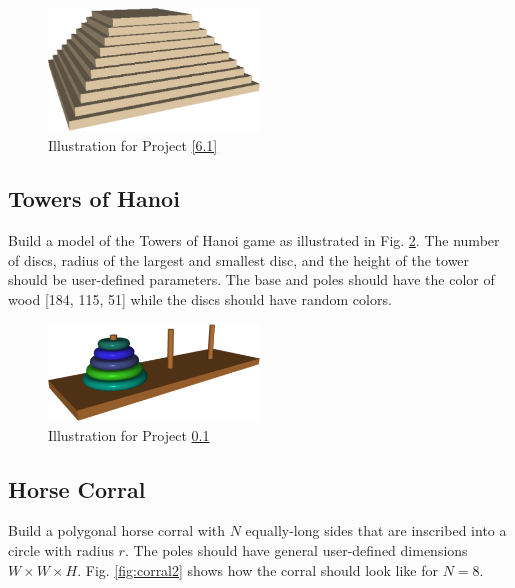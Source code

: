 \begin{figure}[!ht]
\begin{center}
\includegraphics[width=0.5\textwidth]{img/aztec.png}
\end{center}
\vspace{-2mm}
\caption{Illustration for Project \ref{6.1}}
\label{fig:aztec}
\end{figure}
\noindent



\subsection{Towers of Hanoi} \label{6.2}
Build a model of the Towers of Hanoi game as illustrated in Fig. \ref{fig:hanoi}. 
The number of discs, radius of the largest and smallest disc, and the height of the tower 
should be user-defined parameters. The base and poles should have the color of wood
[184, 115, 51] while the discs should have random colors.


\begin{figure}[!ht]
\begin{center}
\includegraphics[width=0.5\textwidth]{img/hanoi.png}
\end{center}
\vspace{-2mm}
\caption{Illustration for Project \ref{6.2}}
\label{fig:hanoi}
\end{figure}
\noindent


\subsection{Horse Corral} \label{6.3}
Build a polygonal horse corral with $N$ equally-long sides that are inscribed into a circle with radius $r$.
The poles should have general user-defined dimensions $W \times W \times H$. Fig. \ref{fig:corral2} shows 
how the corral should look like for $N = 8$.

